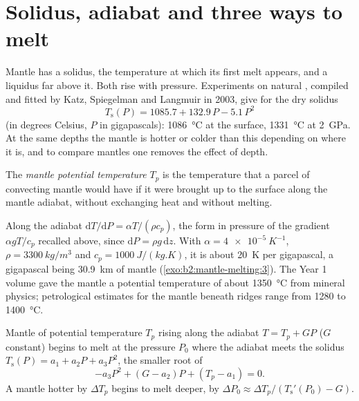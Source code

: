 \section{Solidus, adiabat and three ways to melt}\label{sec:b2:mantle-melting:solidus}

Mantle  has a solidus, the temperature at which its first melt appears,
and a liquidus far above it. Both rise with pressure. Experiments on natural
, compiled and fitted by Katz, Spiegelman and Langmuir in 2003, give
for the dry solidus
\[
  T_{\mathrm{s}}(P) = 1085.7 + 132.9\,P - 5.1\,P^2
\]
(in degrees Celsius, $P$ in gigapascals): \qty{1086}{\celsius} at the surface,
\qty{1331}{\celsius} at \qty{2}{GPa}. At the same depths the mantle is hotter or
colder than this depending on where it is, and to compare mantles one removes the
effect of depth.

\begin{definition}\label{def:b2:mantle-melting:tp}
The \emph{mantle potential temperature} $T_p$
is the temperature that a parcel of convecting mantle would have if it were
brought up to the surface along the mantle adiabat, without exchanging heat and
without melting.
\end{definition}

Along the adiabat $\mathrm dT/\mathrm dP = \alpha T/(\rho c_p)$, the form in
pressure of the gradient $\alpha gT/c_p$ recalled above, since $\mathrm dP = \rho
g\,\mathrm dz$. With $\alpha = \qty{4e-5}{K^{-1}}$, $\rho = \qty{3300}{kg/m^3}$
and $c_p = \qty{1000}{J/(kg.K)}$, it is about \qty{20}{K} per gigapascal, a
gigapascal being \qty{30.9}{km} of mantle (\cref{exo:b2:mantle-melting:3}). The Year 1 volume gave
the mantle a potential temperature of about \qty{1350}{\celsius} from mineral
physics; petrological estimates for the mantle beneath ridges range from 1280 to
\qty{1400}{\celsius}.

\begin{proposition}\label{prop:b2:mantle-melting:onset}
Mantle of potential temperature $T_p$ rising along the adiabat $T = T_p + GP$ ($G$
constant) begins to melt at the pressure $P_0$ where the adiabat meets the
solidus $T_{\mathrm s}(P) = a_1 + a_2P + a_3P^2$, the smaller root of
\[
  -a_3P^2 + (G - a_2)P + (T_p - a_1) = 0 .
\]
A mantle hotter by $\Delta T_p$ begins to melt deeper, by $\Delta P_0 \approx
\Delta T_p/(T_{\mathrm s}'(P_0) - G)$.
\end{proposition}


